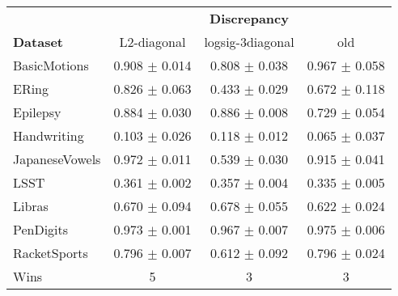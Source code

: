 \begin{tabular}{lccc}
\toprule
{} & \multicolumn{3}{c}{\textbf{Discrepancy}} \\
\textbf{Dataset} &          L2-diagonal &   logsig-3diagonal &                old \\
\midrule
BasicMotions    &    0.908 $\pm$ 0.014 &  0.808 $\pm$ 0.038 &  0.967 $\pm$ 0.058 \\
ERing           &    0.826 $\pm$ 0.063 &  0.433 $\pm$ 0.029 &  0.672 $\pm$ 0.118 \\
Epilepsy        &    0.884 $\pm$ 0.030 &  0.886 $\pm$ 0.008 &  0.729 $\pm$ 0.054 \\
Handwriting     &    0.103 $\pm$ 0.026 &  0.118 $\pm$ 0.012 &  0.065 $\pm$ 0.037 \\
JapaneseVowels  &    0.972 $\pm$ 0.011 &  0.539 $\pm$ 0.030 &  0.915 $\pm$ 0.041 \\
LSST            &    0.361 $\pm$ 0.002 &  0.357 $\pm$ 0.004 &  0.335 $\pm$ 0.005 \\
Libras          &    0.670 $\pm$ 0.094 &  0.678 $\pm$ 0.055 &  0.622 $\pm$ 0.024 \\
PenDigits       &    0.973 $\pm$ 0.001 &  0.967 $\pm$ 0.007 &  0.975 $\pm$ 0.006 \\
RacketSports    &    0.796 $\pm$ 0.007 &  0.612 $\pm$ 0.092 &  0.796 $\pm$ 0.024 \\ 
\midrule
Wins &            5 &                 3 &    3 \\
\bottomrule
\end{tabular}
